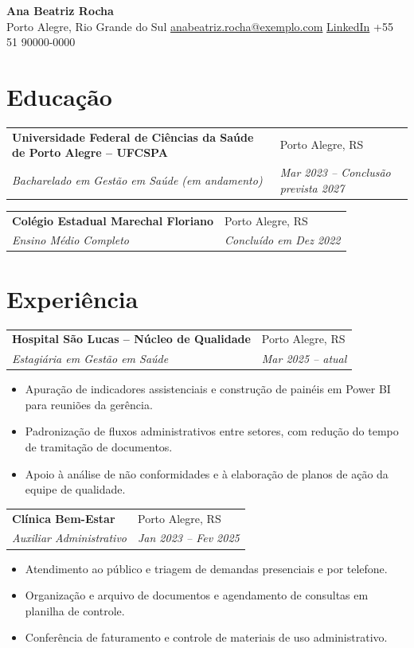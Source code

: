 \documentclass[a4paper,10pt]{article}
\makeatletter
\newcommand{\cventry}[4]{%
    \noindent\begin{tabularx}{\textwidth}{@{}>{\raggedright\arraybackslash}X >{\raggedleft\arraybackslash}X@{}}
    \textbf{#1} & #2 \\ \textit{#3} & \textit{#4} \\ \end{tabularx}}
\makeatother
\begin{document}
\begin{center}
    {\LARGE \textbf{Ana Beatriz Rocha}} \\ [0.1cm]
    Porto Alegre, Rio Grande do Sul
    {\textbullet}
    \href{mailto:anabeatriz.rocha@exemplo.com}{anabeatriz.rocha@exemplo.com}
    {\textbullet}
    \href{https://www.linkedin.com/in/anabeatriz-rocha}{LinkedIn}
    {\textbullet}
    +55 51 90000-0000
\end{center}

\section{Educação}
    \cventry{Universidade Federal de Ciências da Saúde de Porto Alegre -- UFCSPA}{Porto Alegre, RS}{Bacharelado em Gestão em Saúde (em andamento)}{Mar 2023 -- Conclusão prevista 2027}

    \cventry{Colégio Estadual Marechal Floriano}{Porto Alegre, RS}{Ensino Médio Completo}{Concluído em Dez 2022}

\section{Experiência}

    \cventry{Hospital São Lucas -- Núcleo de Qualidade}{Porto Alegre, RS}{Estagiária em Gestão em Saúde}{Mar 2025 -- atual}
        \begin{itemize}
            \item Apuração de indicadores assistenciais e construção de painéis em Power BI para reuniões da gerência.
            \item Padronização de fluxos administrativos entre setores, com redução do tempo de tramitação de documentos.
            \item Apoio à análise de não conformidades e à elaboração de planos de ação da equipe de qualidade.
        \end{itemize}

    \cventry{Clínica Bem-Estar}{Porto Alegre, RS}{Auxiliar Administrativo}{Jan 2023 -- Fev 2025}
        \begin{itemize}
            \item Atendimento ao público e triagem de demandas presenciais e por telefone.
            \item Organização e arquivo de documentos e agendamento de consultas em planilha de controle.
            \item Conferência de faturamento e controle de materiais de uso administrativo.
        \end{itemize}
\end{document}
